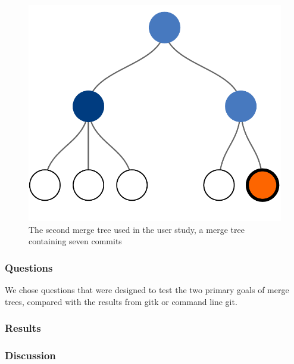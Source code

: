 \begin{figure}[htpb]
  \centering
  \includegraphics[width=0.5\linewidth]{figures/commits/7-commits.pdf}
  \caption{The second merge tree used in the user study, a merge tree
    containing seven commits}
  \label{fig:commit_2}
\end{figure}

\subsubsection{Questions}
\label{ssub:questions}

We chose questions that were designed to test the two primary goals of
merge trees, compared with the results from gitk or command line git.

\subsubsection{Results}
\label{ssub:results}

\subsubsection{Discussion}
\label{ssub:discussion}

